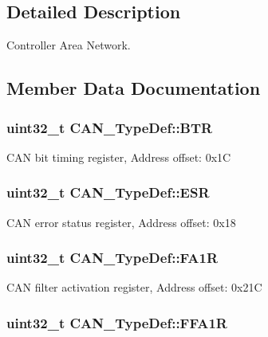 \subsection{Detailed Description}
Controller Area Network. 

\subsection{Member Data Documentation}
\hypertarget{struct_c_a_n___type_def_accad1e4155459a13369f5ad0e7c6da29}{
\subsubsection[{B\-T\-R}]{ uint32\-\_\-t C\-A\-N\-\_\-\-Type\-Def\-::\-B\-T\-R}}\label{struct_c_a_n___type_def_accad1e4155459a13369f5ad0e7c6da29}
C\-A\-N bit timing register, Address offset\-: 0x1\-C \hypertarget{struct_c_a_n___type_def_ab1a1b6a7c587443a03d654d3b9a94423}{
\subsubsection[{E\-S\-R}]{ uint32\-\_\-t C\-A\-N\-\_\-\-Type\-Def\-::\-E\-S\-R}}\label{struct_c_a_n___type_def_ab1a1b6a7c587443a03d654d3b9a94423}
C\-A\-N error status register, Address offset\-: 0x18 \hypertarget{struct_c_a_n___type_def_ab57a3a6c337a8c6c7cb39d0cefc2459a}{
\subsubsection[{F\-A1\-R}]{ uint32\-\_\-t C\-A\-N\-\_\-\-Type\-Def\-::\-F\-A1\-R}}\label{struct_c_a_n___type_def_ab57a3a6c337a8c6c7cb39d0cefc2459a}
C\-A\-N filter activation register, Address offset\-: 0x21\-C \hypertarget{struct_c_a_n___type_def_ae2decd14b26f851e00a31b42d15293ce}{
\subsubsection[{F\-F\-A1\-R}]{ uint32\-\_\-t C\-A\-N\-\_\-\-Type\-Def\-::\-F\-F\-A1\-R}}\label{struct_c_a_n___type_def_ae2decd14b26f851e00a31b42d15293ce}
